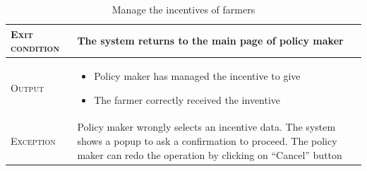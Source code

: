 \begin{table}[H]
\begin{tabular}{|l|p{}|}
        \hline %
        \textsc{Exit condition}    &  The system returns to the main page of policy maker\\
    	\hline %
    	\textsc{Output}             &  \begin{itemize}
    	    \item Policy maker has managed the incentive to give
    	    \item The farmer correctly received the inventive
    	\end{itemize}\\
    	\hline %
    	\textsc{Exception}         &  Policy maker wrongly selects an incentive data. The 
    	system shows a popup to ask a confirmation to proceed. The policy maker can redo the operation by clicking on “Cancel” button\\
    	\hline %
        
    \end{tabular}
    \caption{\label{tab:visualize_incentives}Manage the incentives of farmers} 
\end{table}

